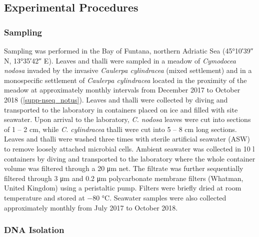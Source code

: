 \documentclass[12pt,]{article}
\begin{document}
\newpage

\hypertarget{experimental-procedures}{%
\subsection{Experimental Procedures}\label{experimental-procedures}}

\hypertarget{sampling}{%
\subsubsection{Sampling}\label{sampling}}

Sampling was performed in the Bay of Funtana, northern Adriatic Sea
(\ang{45;10;39} N, \ang{13;35;42} E). Leaves and thalli were sampled in
a meadow of \emph{Cymodocea nodosa} invaded by the invasive
\emph{Caulerpa cylindracea} (mixed settlement) and in a monospecific
settlement of \emph{Caulerpa cylindracea} located in the proximity of
the meadow at approximately monthly intervals from December 2017 to
October 2018 (\autoref{supp-nseq_notus}). Leaves and thalli were
collected by diving and transported to the laboratory in containers
placed on ice and filled with site seawater. Upon arrival to the
laboratory, \emph{C. nodosa} leaves were cut into sections of 1 -- 2
\si{\cm}, while \emph{C. cylindracea} thalli were cut into 5 -- 8
\si{\cm} long sections. Leaves and thalli were washed three times with
sterile artificial seawater (ASW) to remove loosely attached microbial
cells. Ambient seawater was collected in 10 \si{\l} containers by diving
and transported to the laboratory where the whole container volume was
filtered through a 20 \si{\um} net. The filtrate was further
sequentially filtered through 3 \si{\um} and 0.2 \si{\um} polycarbonate
membrane filters (Whatman, United Kingdom) using a peristaltic pump.
Filters were briefly dried at room temperature and stored at \num{-80}
\si{\degreeCelsius}. Seawater samples were also collected approximately
monthly from July 2017 to October 2018.

\hypertarget{dna-isolation}{%
\subsubsection{DNA Isolation}\label{dna-isolation}}
\end{document}
